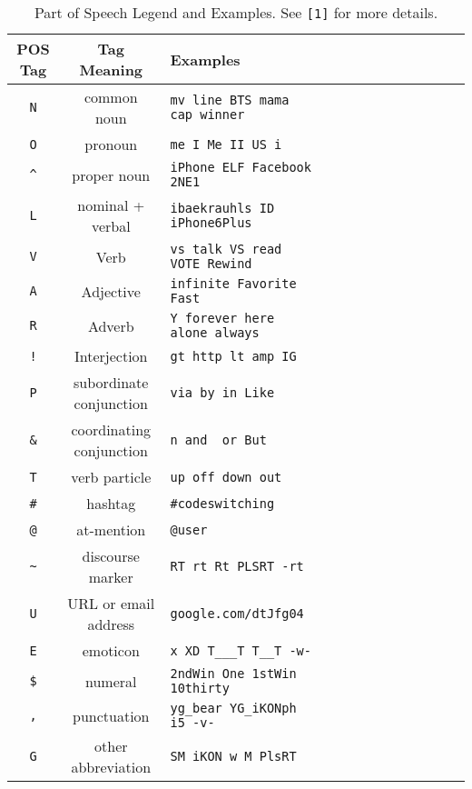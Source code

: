 \documentclass[conference]{IEEEtran}
\begin{document}


\begin{table}[h!] 
 \caption{Part of Speech Legend and Examples. See {\tt [1]} for more details.}
\centering %
\begin{tabular}{c c l c c c rrrrrrr} %
\hline\hline %
POS Tag		&	Tag Meaning	& 	Examples	
\\ [0.5ex] 
\hline 
\verb|N| 	&	common noun & \verb|mv line BTS mama cap winner|	  	 \\ 
\verb|O|  	&	pronoun & 	 \verb|me I Me II US i| 	 \\ 
\verb|^| 	&	proper noun & 	 \verb|iPhone ELF Facebook  2NE1| 	 \\
\verb|L|  	&	nominal + verbal & 	 {\tt ibaekrauhls ID iPhone6Plus}	 \\
\verb|V|  	&	Verb & 	 \verb|vs talk VS read VOTE Rewind| 	 \\
\verb|A|  	&	Adjective & 	 \verb|infinite Favorite Fast|	 \\
\verb|R|  	&	Adverb & 	 \verb|Y forever here alone always| 	 \\
\verb|!|  	&	Interjection & 	 \verb|gt http lt amp IG| 	 \\ 
\verb|P|  	&	subordinate conjunction & 	 \verb|via by in Like| 	 \\ 
\verb|&|  	&	coordinating conjunction & 	\verb|n and  or But|	 \\ 
\verb|T|  	&	verb particle & 	 \verb|up off down out| 	 \\ 
\verb|#|  	&	hashtag & 	 \verb|#codeswitching| 	 \\ 
\verb|@|  	&	at-mention & 	 \verb|@user| 	 \\
\verb|~|  	&	discourse marker & 	 \verb|RT rt Rt PLSRT -rt| 	 \\ 
\verb|U|  	&	URL or email address & 	 \verb|google.com/dtJfg04| 	 \\ 
\verb|E|  	&	emoticon & 	 \verb|x XD T___T T__T -w-| 	 \\ 
\verb|$|  	&	numeral & 	  \verb|2ndWin One 1stWin 10thirty |  	 \\ 
\verb|,|  	&	punctuation & 	 \verb|yg_bear YG_iKONph i5 -v-| 	 \\ 
\verb|G|  	&	other abbreviation & 	 \verb|SM iKON w M PlsRT| 	 \\ 
\hline %
\end{tabular} 
\label{tab:pos_legend} 
\end{table} 
\end{document}
